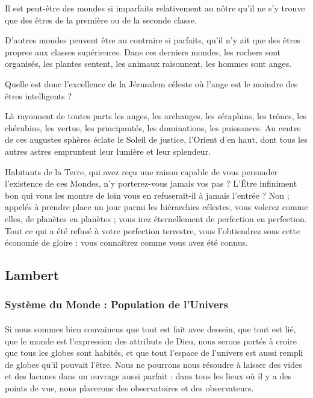 \documentclass[a4paper, 11pt, oneside, landscape]{article}
\begin{document}
Il est peut-être des mondes si imparfaits relativement au nôtre qu'il ne s'y trouve que des êtres de la première ou de la seconde classe.

D'autres mondes peuvent être au contraire si parfaits, qu'il n'y ait que des êtres propres aux classes supérieures. Dans ces derniers mondes, les rochers sont organisés, les plantes sentent, les animaux raisonnent, les hommes sont anges.

Quelle est donc l'excellence de la Jérusalem céleste où l'ange est le moindre des êtres intelligents ?

Là rayonnent de toutes parts les anges, les archanges, les séraphins, les trônes, les chérubins, les vertus, les principautés, les dominations, les puissances. Au centre de ces augustes sphères éclate le Soleil de justice, l'Orient d'en haut, dont tous les autres astres empruntent leur lumière et leur splendeur.

Habitants de la Terre, qui avez reçu une raison capable de vous persuader l'existence de ces Mondes, n'y porterez-vous jamais vos pas ? L'Être infiniment bon qui vous les montre de loin vous en refuserait-il à jamais l'entrée ? Non ; appelés à prendre place un jour parmi les hiérarchies célestes, vous volerez comme elles, de planètes en planètes ; vous irez éternellement de perfection en perfection. Tout ce qui a été refusé à votre perfection terrestre, vous l'obtiendrez sous cette économie de gloire : vous connaîtrez comme vous avez été connus.
\clearpage
\subsection{Lambert}
\subsubsection{Système du Monde : Population de l'Univers}
\paragraph{}
Si nous sommes bien convaincus que tout est fait avec dessein, que tout est lié, que le monde est l'expression des attributs de Dieu, nous serons portés à croire que tous les globes sont habités, et que tout l'espace de l'univers est aussi rempli de globes qu'il pouvait l'être. Nous ne pourrons nous résoudre à laisser des vides et des lacunes dans un ouvrage aussi parfait : dans tous les lieux où il y a des points de vue, nous placerons des observatoires et des observateurs.
\end{document}
